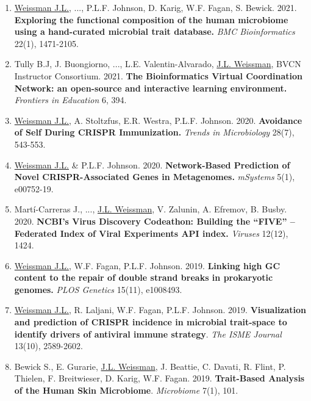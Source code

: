 \documentclass[]{res}
\begin{document}
\begin{resume}
\begin{enumerate}[leftmargin=*]
\item \underline{Weissman J.L.}, ..., P.L.F. Johnson, D. Karig, W.F. Fagan, S. Bewick. 2021. {\bf Exploring the functional composition of the human microbiome using a hand-curated microbial trait database.} \emph{BMC Bioinformatics} 22(1), 1471-2105.

\item Tully B.J, J. Buongiorno, ..., L.E. Valentin-Alvarado, \underline{J.L. Weissman}, BVCN Instructor Consortium. 2021. {\bf The Bioinformatics Virtual Coordination Network: an open-source and interactive learning environment.} \emph{Frontiers in Education} 6, 394.

\item \underline{Weissman J.L.}, A. Stoltzfus, E.R. Westra, P.L.F. Johnson. 2020. {\bf Avoidance of Self During CRISPR Immunization.} \emph{Trends in Microbiology} 28(7), 543-553.

\item \underline{Weissman J.L.} \& P.L.F. Johnson. 2020. {\bf Network-Based Prediction of Novel CRISPR-Associated Genes in Metagenomes.} \emph{mSystems} 5(1), e00752-19.

\item Mart\'{i}-Carreras J., ..., \underline{J.L. Weissman}, V. Zalunin, A. Efremov, B. Busby. 2020. {\bf NCBI’s Virus Discovery Codeathon: Building the “FIVE” -- Federated Index of Viral Experiments API index.} \emph{Viruses} 12(12), 1424.
 
 \item \underline{Weissman J.L.}, W.F. Fagan, P.L.F. Johnson. 2019. {\bf Linking high GC content to the repair of double strand breaks in prokaryotic genomes.} \emph{PLOS Genetics} 15(11), e1008493.\\ %
 
 \item \underline{Weissman J.L.}, R. Laljani, W.F. Fagan, P.L.F. Johnson. 2019. {\bf Visualization and prediction of CRISPR incidence in microbial trait-space to identify drivers of antiviral immune strategy}. \emph{The ISME Journal} 13(10), 2589-2602. %
 
 \item Bewick S., E. Gurarie, \underline{J.L. Weissman}, J. Beattie, C. Davati, R. Flint, P. Thielen, F. Breitwieser, D. Karig, W.F. Fagan. 2019. {\bf Trait-Based Analysis of the Human Skin Microbiome}. \emph{Microbiome} 7(1), 101.  %


\end{enumerate}
\end{resume}
\end{document}
